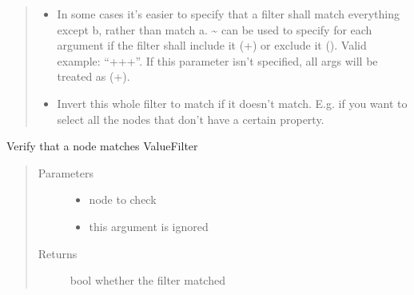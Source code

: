 \documentclass[a4paper,10pt,english]{sphinxmanual}
\begin{document}
\begin{fulllineitems}
\begin{fulllineitems}
\begin{quote}
\begin{description}
\begin{itemize}
\item {}
\sphinxAtStartPar
{} \textendash{} In some cases it’s easier to specify that a filter shall match everything except b, rather than
match a. \textasciitilde{} can be used to specify for each argument if the filter shall include it (+) or exclude it
(\sphinxhyphen{}). Valid example: “++\sphinxhyphen{}+”. If this parameter isn’t specified, all args will be treated as (+).

\item {}
\sphinxAtStartPar
{} \textendash{} Invert this whole filter to match if it doesn’t match. E.g. if you want to select all the nodes
that don’t have a certain property.

\end{itemize}

\end{description}\end{quote}

\end{fulllineitems}


\begin{fulllineitems}
\label{\detokenize{fagus:fagus.VFil.match_node}}
\pysigstartsignatures
{}
\pysigstopsignatures
\sphinxAtStartPar
Verify that a node matches ValueFilter
\begin{quote}\begin{description}
\item[{Parameters}] \leavevmode\begin{itemize}
\item {}
\sphinxAtStartPar
{} \textendash{} node to check

\item {}
\sphinxAtStartPar
\sphinxstyleliteralstrong{\sphinxupquote{\_}} \textendash{} this argument is ignored

\end{itemize}

\item[{Returns}] \leavevmode
\sphinxAtStartPar
bool whether the filter matched


\end{description}
\end{quote}
\end{fulllineitems}
\end{fulllineitems}
\end{document}

